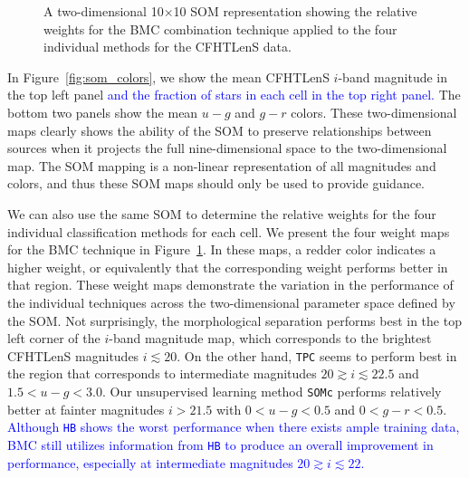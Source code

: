\documentclass[useAMS,usenatbib]{mn2e}
\begin{document}
\begin{figure}
\begin{minipage}[t]{0.49\linewidth}
    \caption{A two-dimensional 10$\times$10 SOM representation
             showing the relative weights for the BMC combination technique
             applied to the four individual methods for the CFHTLenS data.}
    \label{fig:weights}
  \end{minipage}
\end{figure}

In Figure~\ref{fig:som_colors}, we show
the mean CFHTLenS $i$-band magnitude in the top left panel
\textcolor{blue}{
and the fraction of stars in each cell in the top right panel.
}
The bottom two panels show the mean $u-g$ and  $g-r$ colors.
These two-dimensional maps clearly shows
the ability of the SOM to preserve relationships between sources
when it projects the full nine-dimensional space to the two-dimensional map.
The SOM mapping is a non-linear representation of all magnitudes and colors,
and thus these SOM maps should only be used to provide guidance.

We can also use the same SOM to determine the relative weights for 
the four individual classification methods for each cell.
We present the four weight maps for the BMC technique
in Figure~\ref{fig:weights}.
In these maps, a redder color indicates a higher weight,
or equivalently that the corresponding weight performs better in that region.
These weight maps demonstrate the variation in
the performance of the individual techniques across
the two-dimensional parameter space defined by the SOM.
Not surprisingly, the morphological separation
performs best in the top left corner of the $i$-band magnitude map,
which corresponds to the brightest CFHTLenS magnitudes $i \lesssim 20$.
On the other hand, \texttt{TPC} seems to perform best
in the region that corresponds to intermediate magnitudes
$20\gtrsim i \lesssim22.5$ and $1.5<u-g<3.0$.
Our unsupervised learning method \texttt{SOMc}
performs relatively better at fainter magnitudes $i>21.5$
with $0<u-g<0.5$ and $0<g-r<0.5$.
\textcolor{blue}{
Although \texttt{HB} shows the worst performance
when there exists ample training data,
BMC still utilizes information from \texttt{HB}
to produce an overall improvement in performance,
especially at intermediate magnitudes $20\gtrsim i \lesssim22$.
}
\end{document}
